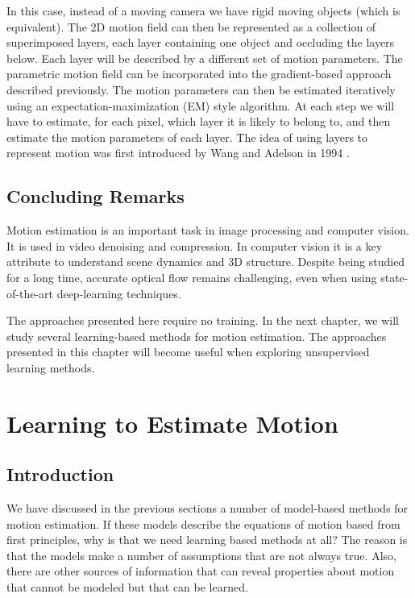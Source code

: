 In this case, instead of a moving camera we have rigid moving objects (which is equivalent). The 2D motion field can then be represented as a collection of superimposed layers, each layer containing one object and occluding the layers below. Each layer will be described by a different set of motion parameters. The parametric motion field can be incorporated into the gradient-based approach described previously. The motion parameters can then be estimated iteratively using an expectation-maximization (EM) style algorithm. At each step we will have to estimate, for each pixel, which layer it is likely to belong to, and then estimate the motion parameters of each layer. The idea of using layers to represent motion was first introduced by Wang and Adelson in 1994 \cite{Wang1994}.

\section{Concluding Remarks}

Motion estimation is an important task in image processing and computer vision. It is used in video denoising and compression. In computer vision it is a key attribute to understand scene dynamics and 3D structure. Despite being studied for a long time, accurate optical flow remains challenging, even when using state-of-the-art deep-learning techniques.

The approaches presented here require no training. In the next chapter, we will study several learning-based methods for motion estimation. The approaches presented in this chapter will become useful when exploring unsupervised learning methods.  


\chapter{Learning to Estimate Motion}
\label{chap:learning_to_estimate_motion}

\section{Introduction}

We have discussed in the previous sections a number of model-based methods for motion estimation. If these models describe the equations of motion based from first principles, why is that we need learning based methods at all? The reason is that the models make a number of assumptions that are not always true.  Also, there are other sources of information that can reveal properties about motion that cannot be modeled but that can be learned.

